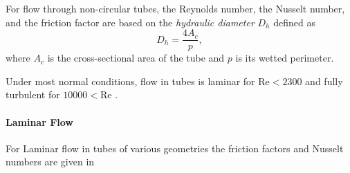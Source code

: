 For flow through non-circular tubes, the Reynolds number, the Nusselt number, and the friction factor are based on the \textit{hydraulic diameter} $D_h$ defined as 
\begin{equation*}
  D_h = \frac{4 A_c}{p}
,\end{equation*}
where $A_c$ is the cross-sectional area of the tube and $p$ is its wetted perimeter.

Under most normal conditions, flow in tubes is laminar for $\mathrm{Re} < \num{2300} $ and fully turbulent for $\num{10000} < \mathrm{Re}$ .

\paragraph{Laminar Flow}
For Laminar flow in tubes of various geometries the friction factors and Nusselt numbers are given in  

